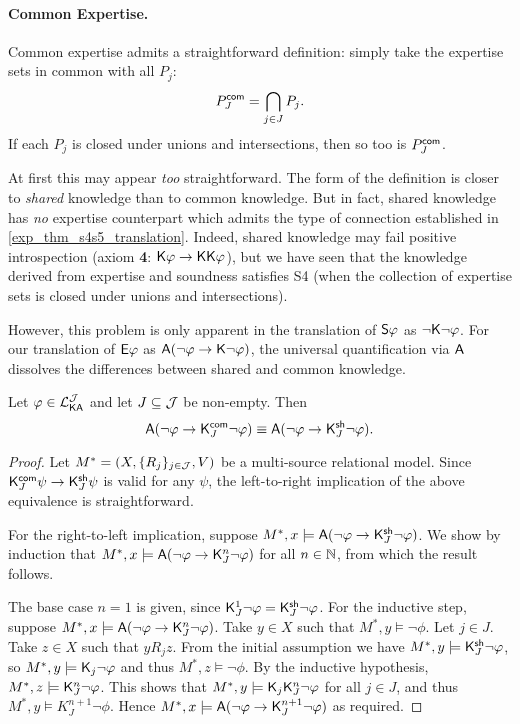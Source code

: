 \paragraph{Common Expertise.}

Common expertise admits a straightforward definition: simply take the expertise
sets in common with all $P_j$:
\[
\Pcommon_J = \bigcap_{j \in J}{P_j}.\]
If each $P_j$ is closed under unions and intersections, then so too is
$\Pcommon_J$.

At first this may appear \emph{too} straightforward. The form of the definition
is closer to \emph{shared} knowledge than to common knowledge. But in fact,
shared knowledge has \emph{no} expertise counterpart which admits the type of
connection established in \cref{exp_thm_s4s5_translation}. Indeed, shared knowledge
may fail positive introspection (axiom \textbf{4}: $\K\phi \limplies
\K\K\phi$), but we have seen that the knowledge derived from expertise and
soundness satisfies S4 (when the collection of expertise sets is closed under
unions and intersections).

However, this problem is only apparent in the translation of $\S\phi$ as
$\neg\K\neg\phi$. For our translation of $\E\phi$ as $\A(\neg\phi \limplies
\K\neg\phi)$, the universal quantification via $\A$ dissolves the differences
between shared and common knowledge.

\begin{proposition}
\label{exp_prop_shared_common_collapse}
Let $\phi \in \cLKAJ$ and let $J \subseteq \J$ be non-empty.
Then
\[
\A(\neg\phi \limplies \Kcommon_J\neg\phi)
\equiv
\A(\neg\phi \limplies \Kshared_J\neg\phi).\]
\end{proposition}

\begin{proof}

Let $M^* = (X, \{R_j\}_{j \in \J}, V)$ be a multi-source relational
model. Since $\Kcommon_J\psi \limplies \Kshared_J\psi$ is valid for
any $\psi$, the left-to-right implication of the above equivalence
is straightforward.

For the right-to-left implication, suppose $M^*, x \models
\A(\neg\phi \limplies \Kshared_J\neg\phi)$. We show by induction that
$M^*, x \models \A(\neg\phi \limplies \K_J^n\neg\phi)$ for all
$n \in \N$, from which the result follows.

The base case $n = 1$ is given, since $\K_J^1\neg\phi =
\Kshared_J\neg\phi$. For the inductive step, suppose $M^*, x
\models \A(\neg\phi \limplies \K_J^n\neg\phi)$. Take $y \in X$ such
that $M^*, y \models \neg\phi$. Let $j \in J$. Take $z
\in X$ such that $y{R_j}z$. From the initial assumption we have
$M^*, y \models \Kshared_J\neg\phi$, so $M^*, y \models
\K_j\neg\phi$ and thus $M^*, z \models \neg\phi$. By the inductive
hypothesis, $M^*, z \models \K_J^n\neg\phi$. This shows that
$M^*, y \models \K_j\K_J^n\neg\phi$ for all $j \in J$, and
thus $M^*, y \models K^{n+1}_J\neg\phi$. Hence $M^*, x
\models \A(\neg\phi \limplies \K^{n+1}_J\neg\phi)$ as required.
\end{proof}

